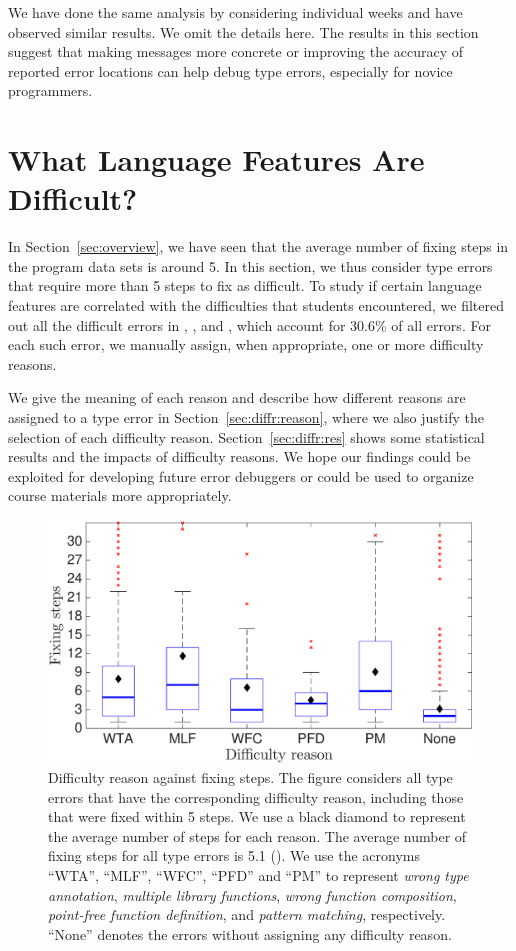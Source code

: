 \documentclass[12pt]{report}	%
\begin{document}
We have done the same analysis by considering individual
weeks and have observed similar results. We omit the
details here. The results in this section suggest
that making messages more concrete or 
improving the accuracy of reported error locations
can help debug type errors, especially for novice programmers.

\section{What Language Features Are Difficult?}
\label{sec:difficulty}

In Section~\ref{sec:overview}, we have seen that
the average number of fixing steps in the program data sets 
is around 5.
In this section, we thus
consider type errors that require 
more than 5 steps to fix
as difficult.
%
To study if certain language features are correlated with the
difficulties that students encountered, 
we filtered out all the difficult errors in \benchf, \benchs, and
\benchl, which account for 30.6\% of all errors.
%
For each such error, we manually assign, when appropriate, one
or more difficulty reasons.


We give the meaning of each reason and 
describe how different reasons are assigned 
to a type error in Section~\ref{sec:diffr:reason}, 
where we also justify the selection of each difficulty reason.
Section~\ref{sec:diffr:res} shows some statistical results 
and the impacts of difficulty reasons.
We hope our findings could be exploited
for developing future error debuggers
or could be used to organize course materials
more appropriately.

\begin{figure}
\centering
\includegraphics[width=0.85\columnwidth]{images/step_diffr.eps}
\caption[Difficulty reason against fixing steps]{Difficulty reason against fixing steps.
The figure considers all type errors that have the corresponding
difficulty reason, including those that
were fixed within 5 steps.
%
We use a black diamond to represent the average number of steps for each reason.
The average number of fixing steps for all type errors is 5.1 ().
We use the acronyms ``WTA'', ``MLF'', ``WFC'', ``PFD'' and ``PM'' to represent \emph{wrong type annotation}, \emph{multiple library functions}, \emph{wrong function composition}, \emph{point-free function definition}, and \emph{pattern matching}, respectively. ``None'' denotes the errors without assigning any difficulty reason.}
\label{fig:diffr2}
\end{figure}
\end{document}
